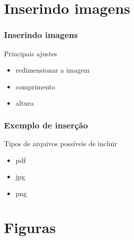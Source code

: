 
\section{Inserindo imagens}

\begin{frame}
  \frametitle{Inserindo imagens}
  

  \begin{block}{Principais ajustes}
    \begin{itemize}
    \item {} redimensionar a imagem
    \item {} comprimento
    \item {} altura
    \end{itemize}
  \end{block}

\end{frame}


\begin{frame}
  \frametitle{Exemplo de inserção}

   \texttt{\brown{[width=2cm]}}
\qquad

\bigskip

  \begin{block}{Tipos de arquivos possíveis de incluir}
    \begin{itemize}
    \item pdf
    \item jpg
    \item png
    \end{itemize}
  \end{block}

\end{frame}

\section{Figuras}

